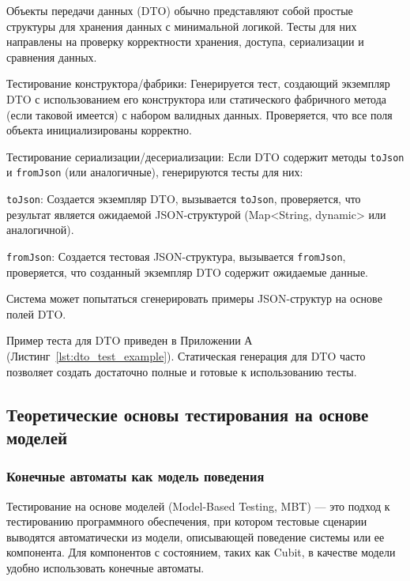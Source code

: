 \documentclass[14pt, russian]{scrartcl}
\begin{document}
Объекты передачи данных (DTO) обычно представляют собой простые структуры для хранения данных с минимальной логикой. Тесты для них направлены на проверку корректности хранения, доступа, сериализации и сравнения данных.

\begin{enumerate*}
    \item {Тестирование конструктора/фабрики:} Генерируется тест, создающий экземпляр DTO с использованием его конструктора или статического фабричного метода (если таковой имеется) с набором валидных данных. Проверяется, что все поля объекта инициализированы корректно.
    \item {Тестирование сериализации/десериализации:} Если DTO содержит методы \texttt{toJson} и \texttt{fromJson} (или аналогичные), генерируются тесты для них:
        \begin{itemize*}
            \item \texttt{toJson}: Создается экземпляр DTO, вызывается \texttt{toJson}, проверяется, что результат является ожидаемой JSON-структурой (Map<String, dynamic> или аналогичной).
            \item \texttt{fromJson}: Создается тестовая JSON-структура, вызывается \texttt{fromJson}, проверяется, что созданный экземпляр DTO содержит ожидаемые данные.
        \end{itemize*}
        Система может попытаться сгенерировать примеры JSON-структур на основе полей DTO.
\end{enumerate*}

Пример теста для DTO приведен в Приложении А (Листинг~\ref{lst:dto_test_example}). Статическая генерация для DTO часто позволяет создать достаточно полные и готовые к использованию тесты.

\subsection{Теоретические основы тестирования на основе моделей}

\subsubsection{Конечные автоматы как модель поведения}

Тестирование на основе моделей (Model-Based Testing, MBT) — это подход к тестированию программного обеспечения, при котором тестовые сценарии выводятся автоматически из модели, описывающей поведение системы или ее компонента. Для компонентов с состоянием, таких как Cubit, в качестве модели удобно использовать конечные автоматы.
\end{document}

